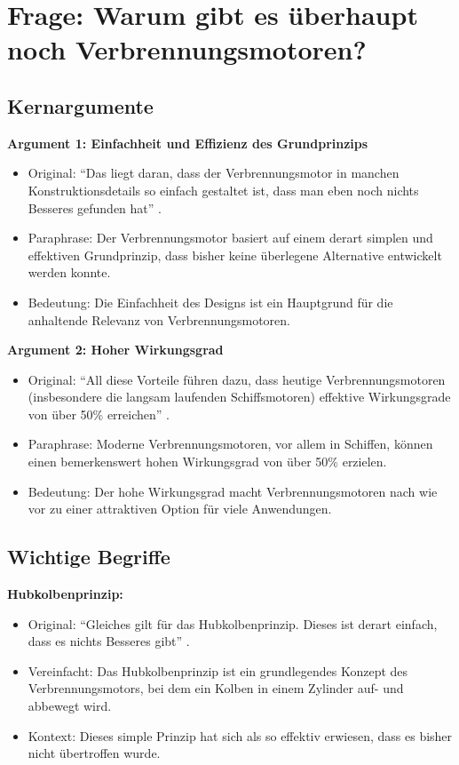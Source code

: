 \documentclass[a4paper,12pt]{article}
\begin{document}
\section{Frage: Warum gibt es überhaupt noch Verbrennungsmotoren?}

\subsection{Kernargumente}

\textbf{Argument 1: Einfachheit und Effizienz des Grundprinzips}

\begin{itemize}
    \item Original: \enquote{Das liegt daran, dass der Verbrennungsmotor in manchen Konstruktionsdetails so einfach gestaltet ist, dass man eben noch nichts Besseres gefunden hat} \parencite{Schreiner2020}.
    \item Paraphrase: Der Verbrennungsmotor basiert auf einem derart simplen und effektiven Grundprinzip, dass bisher keine überlegene Alternative entwickelt werden konnte.
    \item Bedeutung: Die Einfachheit des Designs ist ein Hauptgrund für die anhaltende Relevanz von Verbrennungsmotoren.
\end{itemize}

\textbf{Argument 2: Hoher Wirkungsgrad}

\begin{itemize}
    \item Original: \enquote{All diese Vorteile führen dazu, dass heutige Verbrennungsmotoren (insbesondere die langsam laufenden Schiffsmotoren) effektive Wirkungsgrade von über 50\% erreichen} \parencite{Schreiner2020}.
    \item Paraphrase: Moderne Verbrennungsmotoren, vor allem in Schiffen, können einen bemerkenswert hohen Wirkungsgrad von über 50\% erzielen.
    \item Bedeutung: Der hohe Wirkungsgrad macht Verbrennungsmotoren nach wie vor zu einer attraktiven Option für viele Anwendungen.
\end{itemize}

\subsection{Wichtige Begriffe}

\textbf{Hubkolbenprinzip:}

\begin{itemize}
    \item Original: \enquote{Gleiches gilt für das Hubkolbenprinzip. Dieses ist derart einfach, dass es nichts Besseres gibt} \parencite{Schreiner2020}.
    \item Vereinfacht: Das Hubkolbenprinzip ist ein grundlegendes Konzept des Verbrennungsmotors, bei dem ein Kolben in einem Zylinder auf- und abbewegt wird.
    \item Kontext: Dieses simple Prinzip hat sich als so effektiv erwiesen, dass es bisher nicht übertroffen wurde.
\end{itemize}
\end{document}

